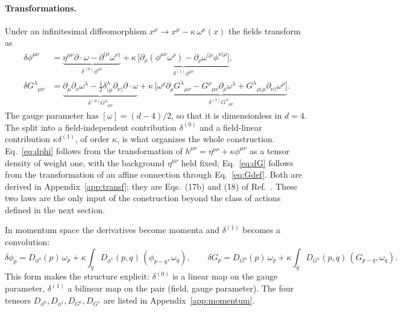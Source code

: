 \documentclass[prd,aps,preprint,superscriptaddress,nofootinbib,amsmath,amssymb,eqsecnum]{revtex4-2}
\newcommand{\ip}[1]{\int_{#1}}
\begin{document}
\paragraph{Transformations.} Under an infinitesimal diffeomorphism
$x^\mu\to x^\mu-\kappa\,\omega^\mu(x)$ the fields transform as
\begin{align}
\delta\phi^{\mu\nu}&=
\underbrace{\eta^{\mu\nu}\partial\!\cdot\!\omega-\partial^{(\mu}\omega^{\nu)}}_{\delta^{(0)}\phi^{\mu\nu}}
+\kappa\,\underbrace{\big[\partial_\rho(\phi^{\mu\nu}\omega^\rho)-\partial_\rho\omega^{(\mu}\phi^{\nu)\rho}\big]}_{\delta^{(1)}\phi^{\mu\nu}},
\label{eq:dphi}\\
\delta G^{\lambda}{}_{\mu\nu}&=
\underbrace{\partial_\mu\partial_\nu\omega^\lambda-\tfrac12\delta^{\lambda}_{(\mu}\partial_{\nu)}\partial\!\cdot\!\omega}_{\delta^{(0)}G^{\lambda}{}_{\mu\nu}}
+\kappa\,\underbrace{\big[\omega^\rho\partial_\rho G^{\lambda}{}_{\mu\nu}-G^{\rho}{}_{\mu\nu}\partial_\rho\omega^\lambda
+G^{\lambda}{}_{\rho(\mu}\partial_{\nu)}\omega^\rho\big]}_{\delta^{(1)}G^{\lambda}{}_{\mu\nu}}.
\label{eq:dG}
\end{align}
The gauge parameter has $[\omega]=(d-4)/2$, so that it is dimensionless in $d=4$. The
split into a field-independent contribution $\delta^{(0)}$ and a field-linear contribution
$\kappa\delta^{(1)}$, of order $\kappa$, is what organizes the whole construction.
Eq.~\eqref{eq:dphi} follows from the transformation of $h^{\mu\nu}=\eta^{\mu\nu}+\kappa\phi^{\mu\nu}$
as a tensor density of weight one, with the background $\eta^{\mu\nu}$ held fixed;
Eq.~\eqref{eq:dG} follows from the transformation of an affine connection through
Eq.~\eqref{eq:Gdef}. Both are derived in Appendix~\ref{app:transf}; they are
Eqs.~(17b) and (18) of Ref.~\cite{BrandtMcKeon2015}. These two laws are the only input of the
construction beyond the class of actions defined in the next section.

In momentum space the derivatives become momenta and $\delta^{(1)}$ becomes a convolution:
\begin{equation}
\delta\phi_p=D_{\phi^0}(p)\,\omega_p+\kappa\ip{q}D_{\phi^1}(p,q)\,(\phi_{p-q},\omega_q),\qquad
\delta G_p=D_{G^0}(p)\,\omega_p+\kappa\ip{q}D_{G^1}(p,q)\,(G_{p-q},\omega_q).
\label{eq:dmom}
\end{equation}
This form makes the structure explicit: $\delta^{(0)}$ is a linear map on the gauge parameter,
$\delta^{(1)}$ a bilinear map on the pair (field, gauge parameter). The four tensors
$D_{\phi^0},D_{\phi^1},D_{G^0},D_{G^1}$ are listed in Appendix~\ref{app:momentum}.
\end{document}
